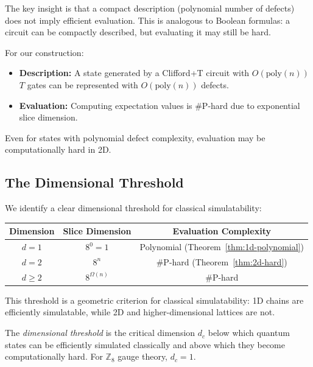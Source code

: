 The key insight is that a compact description (polynomial number of defects) does not imply efficient evaluation. This is analogous to Boolean formulas: a circuit can be compactly described, but evaluating it may still be hard.

For our construction:
\begin{itemize}
    \item \textbf{Description:} A state generated by a Clifford+T circuit with $O(\text{poly}(n))$ $T$ gates can be represented with $O(\text{poly}(n))$ defects.
    \item \textbf{Evaluation:} Computing expectation values is \#P-hard due to exponential slice dimension.
\end{itemize}

\begin{corollary}
Even for states with polynomial defect complexity, evaluation may be computationally hard in 2D.
\end{corollary}

\subsection{The Dimensional Threshold}

We identify a clear dimensional threshold for classical simulatability:

\begin{center}
\begin{tabular}{|c|c|c|}
\hline
Dimension & Slice Dimension & Evaluation Complexity \\
\hline
$d=1$ & $8^0 = 1$ & Polynomial (Theorem~\ref{thm:1d-polynomial}) \\
\hline
$d=2$ & $8^n$ & \#P-hard (Theorem~\ref{thm:2d-hard}) \\
\hline
$d \geq 2$ & $8^{\Omega(n)}$ & \#P-hard \\
\hline
\end{tabular}
\end{center}

This threshold is a geometric criterion for classical simulatability: 1D chains are efficiently simulatable, while 2D and higher-dimensional lattices are not.

\begin{definition}
The \textit{dimensional threshold} is the critical dimension $d_c$ below which quantum states can be efficiently simulated classically and above which they become computationally hard. For $\mathbb{Z}_8$ gauge theory, $d_c = 1$.
\end{definition}
